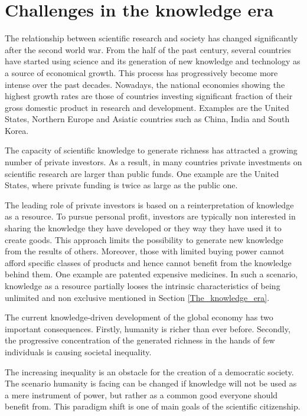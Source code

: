 \section{Challenges in the knowledge era} \label{Challenges_in_the_knowledge_era}
The relationship between scientific research and society has changed significantly after the second world war. From the half of the past century, several countries have started using science and its generation of new knowledge and technology as a source of economical growth. This process has progressively become more intense over the past decades. Nowadays, the national economies showing the highest growth rates are those of countries investing significant fraction of their gross domestic product in research and development. Examples are the United States, Northern Europe and Asiatic countries such as China, India and South Korea.   

The capacity of scientific knowledge to generate richness has attracted a growing number of private investors. As a result, in many countries private investments on scientific research are larger than public funds. One example are the United States, where private funding is twice as large as the public one. 

The leading role of private investors is based on a reinterpretation of knowledge as a resource. To pursue personal profit, investors are typically non interested in sharing the knowledge they have developed or they way they have used it to create goods. This approach limits the possibility to generate new knowledge from the results of others. Moreover, those with limited buying power cannot afford specific classes of products and hence cannot benefit from the knowledge behind them. One example are patented expensive medicines. In such a scenario, knowledge as a resource partially looses the intrinsic characteristics of being unlimited and non exclusive mentioned in Section \ref{The_knowledge_era}. 

The current knowledge-driven development of the global economy has two important consequences. Firstly, humanity is richer than ever before. Secondly, the progressive concentration of the generated richness in the hands of few individuals is causing societal inequality. 

The increasing inequality is an obstacle for the creation of a democratic society. The scenario humanity is facing can be changed if knowledge will not be used as a mere instrument of power, but rather as a common good everyone should benefit from. This paradigm shift is one of main goals of the scientific citizenship.

